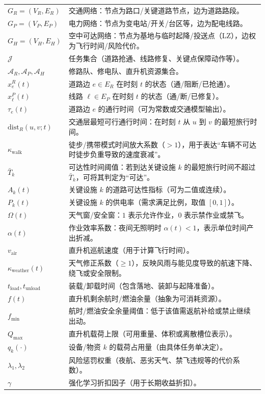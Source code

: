 \documentclass[UTF8,zihao=-4,a4paper,fontset=fandol]{ctexrep}
\begin{document}
\begin{longtable}{p{}p{}}
$G_R=(V_R,E_R)$ & 交通网络：节点为路口/关键道路节点，边为道路路段。\\
$G_P=(V_P,E_P)$ & 电力网络：节点为变电站/开关/台区等，边为配电线路。\\
$G_H=(V_H,E_H)$ & 空中可达网络：节点为基地与临时起降/投送点（LZ），边权为飞行时间/风险代价。\\
$\mathcal{J}$ & 任务集合（道路抢通、线路修复、关键点保障动作等）。\\
$\mathcal{A}_R,\mathcal{A}_P,\mathcal{A}_H$ & 修路队、修电队、直升机资源集合。\\
$x^R_e(t)$ & 道路边 $e\in E_R$ 在时刻 $t$ 的状态（通/阻断/已抢通）。\\
$x^P_\ell(t)$ & 线路 $\ell\in E_P$ 在时刻 $t$ 的状态（通/断/已修复）。\\
$\tau_e(t)$ & 道路边 $e$ 的通行时间（可为常数或交通模型输出）。\\
$\text{dist}_R(u,v;t)$ & 交通层最短可行通行时间：在时刻 $t$ 从 $u$ 到 $v$ 的最短旅行时间。\\
$\kappa_{\text{walk}}$ & 徒步/携带模式时间放大系数（$>1$），用于表达“车辆不可达时徒步负重导致的速度衰减”。\\
$\bar{T}_k$ & 可达性时间阈值：若到达关键设施 $k$ 的最短旅行时间不超过 $\bar{T}_k$，可将其判定为“可达”。\\
$A_k(t)$ & 关键设施 $k$ 的道路可达性指标（可为二值或连续）。\\
$P_k(t)$ & 关键设施 $k$ 的供电率（需求满足比例，取值 $[0,1]$）。\\
$\Omega(t)$ & 天气窗/安全窗：$1$ 表示允许作业，$0$ 表示禁作业或禁飞。\\
$\alpha(t)$ & 作业效率系数：夜间无照明时 $\alpha(t)<1$，表示单位时间产出折减。\\
$v_{\text{air}}$ & 直升机巡航速度（用于计算飞行时间）。\\
$\kappa_{\text{weather}}(t)$ & 天气修正系数（$\ge 1$），反映风雨与能见度导致的航速下降、绕飞或安全限制。\\
$t_{\text{load}},t_{\text{unload}}$ & 装载/卸载时间（包含落地、装卸与起降准备）。\\
$f(t)$ & 直升机剩余航时/燃油余量（抽象为可消耗资源）。\\
$f_{\min}$ & 航时/燃油安全余量阈值：低于该值需返航补给或禁止继续出动。\\
$Q_{\max}$ & 直升机载荷上限（可用重量、体积或离散槽位表示）。\\
$q_k(\cdot)$ & 设备/物资 $k$ 的载荷占用量（由具体任务单决定）。\\
$\lambda_1,\lambda_2$ & 风险惩罚权重（夜航、恶劣天气、禁飞违规等的代价系数）。\\
$\gamma$ & 强化学习折扣因子（用于长期收益折扣）。\\
\end{longtable}
\end{document}
